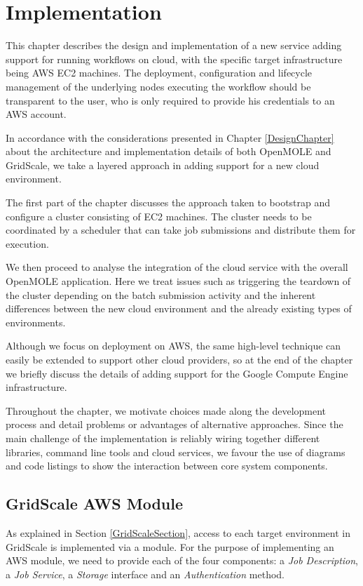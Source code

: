 \chapter{Implementation}

This chapter describes the design and implementation of a new service adding support for running workflows on cloud, with the specific target infrastructure being AWS EC2 machines. The deployment, configuration and lifecycle management of the underlying nodes executing the workflow should be transparent to the user, who is only required to provide his credentials to an AWS account.

In accordance with the considerations presented in Chapter \ref{DesignChapter} about the architecture and implementation details of both OpenMOLE and GridScale, we take a layered approach in adding support for a new cloud environment.

The first part of the chapter discusses the approach taken to bootstrap and configure a cluster consisting of EC2 machines. The cluster needs to be coordinated by a scheduler that can take job submissions and distribute them for execution.

We then proceed to analyse the integration of the cloud service with the overall OpenMOLE application. Here we treat issues such as triggering the teardown of the cluster depending on the batch submission activity and the inherent differences between the new cloud environment and the already existing types of environments.

Although we focus on deployment on AWS, the same high-level technique can easily be extended to support other cloud providers, so at the end of the chapter we briefly discuss the details of adding support for the Google Compute Engine infrastructure.

Throughout the chapter, we motivate choices made along the development process and detail problems or advantages of alternative approaches. Since the main challenge of the implementation is reliably wiring together different libraries, command line tools and cloud services, we favour the use of diagrams and code listings to show the interaction between core system components.

\section{GridScale AWS Module}

As explained in Section \ref{GridScaleSection}, access to each target environment in GridScale is implemented via a module. For the purpose of implementing an AWS module, we need to provide each of the four components: a \textit{Job Description}, a \textit{Job Service}, a \textit{Storage} interface and an \textit{Authentication} method.

